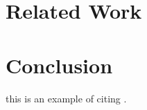 \documentclass{acm_proc_article-sp}
\begin{document}
\section{Related Work }

\section{Conclusion}

this is an example of citing \cite{Laboratories79make}. 



\end{document}
